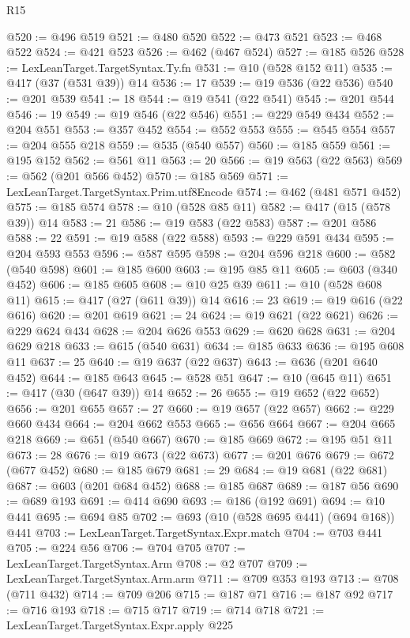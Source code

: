 \begin{lexlean}{R15}
\begin{coremodule}
@520 := @496 @519
@521 := @480 @520
@522 := @473 @521
@523 := @468 @522
@524 := @421 @523
@526 := @462 (@467 @524)
@527 := @185 @526
@528 := LexLeanTarget.TargetSyntax.Ty.fn
@531 := @10 (@528 @152 @11)
@535 := @417 (@37 (@531 @39)) @14
@536 := 17
@539 := @19 @536 (@22 @536)
@540 := @201 @539
@541 := 18
@544 := @19 @541 (@22 @541)
@545 := @201 @544
@546 := 19
@549 := @19 @546 (@22 @546)
@551 := @229 @549 @434
@552 := @204 @551
@553 := @357 @452
@554 := @552 @553
@555 := @545 @554
@557 := @204 @555 @218
@559 := @535 (@540 @557)
@560 := @185 @559
@561 := @195 @152
@562 := @561 @11
@563 := 20
@566 := @19 @563 (@22 @563)
@569 := @562 (@201 @566 @452)
@570 := @185 @569
@571 := LexLeanTarget.TargetSyntax.Prim.utf8Encode
@574 := @462 (@481 @571 @452)
@575 := @185 @574
@578 := @10 (@528 @85 @11)
@582 := @417 (@15 (@578 @39)) @14
@583 := 21
@586 := @19 @583 (@22 @583)
@587 := @201 @586
@588 := 22
@591 := @19 @588 (@22 @588)
@593 := @229 @591 @434
@595 := @204 @593 @553
@596 := @587 @595
@598 := @204 @596 @218
@600 := @582 (@540 @598)
@601 := @185 @600
@603 := @195 @85 @11
@605 := @603 (@340 @452)
@606 := @185 @605
@608 := @10 @25 @39
@611 := @10 (@528 @608 @11)
@615 := @417 (@27 (@611 @39)) @14
@616 := 23
@619 := @19 @616 (@22 @616)
@620 := @201 @619
@621 := 24
@624 := @19 @621 (@22 @621)
@626 := @229 @624 @434
@628 := @204 @626 @553
@629 := @620 @628
@631 := @204 @629 @218
@633 := @615 (@540 @631)
@634 := @185 @633
@636 := @195 @608 @11
@637 := 25
@640 := @19 @637 (@22 @637)
@643 := @636 (@201 @640 @452)
@644 := @185 @643
@645 := @528 @51
@647 := @10 (@645 @11)
@651 := @417 (@30 (@647 @39)) @14
@652 := 26
@655 := @19 @652 (@22 @652)
@656 := @201 @655
@657 := 27
@660 := @19 @657 (@22 @657)
@662 := @229 @660 @434
@664 := @204 @662 @553
@665 := @656 @664
@667 := @204 @665 @218
@669 := @651 (@540 @667)
@670 := @185 @669
@672 := @195 @51 @11
@673 := 28
@676 := @19 @673 (@22 @673)
@677 := @201 @676
@679 := @672 (@677 @452)
@680 := @185 @679
@681 := 29
@684 := @19 @681 (@22 @681)
@687 := @603 (@201 @684 @452)
@688 := @185 @687
@689 := @187 @56
@690 := @689 @193
@691 := @414 @690
@693 := @186 (@192 @691)
@694 := @10 @441
@695 := @694 @85
@702 := @693 (@10 (@528 @695 @441) (@694 @168)) @441
@703 := LexLeanTarget.TargetSyntax.Expr.match
@704 := @703 @441
@705 := @224 @56
@706 := @704 @705
@707 := LexLeanTarget.TargetSyntax.Arm
@708 := @2 @707
@709 := LexLeanTarget.TargetSyntax.Arm.arm
@711 := @709 @353 @193
@713 := @708 (@711 @432)
@714 := @709 @206
@715 := @187 @71
@716 := @187 @92
@717 := @716 @193
@718 := @715 @717
@719 := @714 @718
@721 := LexLeanTarget.TargetSyntax.Expr.apply @225

\end{coremodule}
\end{lexlean}
